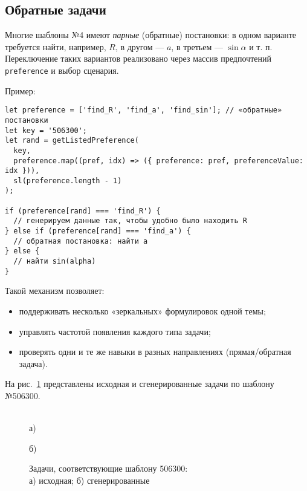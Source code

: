 
\subsection{Обратные задачи}
Многие шаблоны №4 имеют \emph{парные} (обратные) постановки: в одном варианте требуется найти, например, \(R\), в другом — \(a\), в третьем — \(\sin\alpha\) и т. п. 
Переключение таких вариантов реализовано через массив предпочтений \verb|preference| и выбор сценария. 

Пример: 
\begin{lstlisting}
let preference = ['find_R', 'find_a', 'find_sin']; // «обратные» постановки
let key = '506300';
let rand = getListedPreference(
  key,
  preference.map((pref, idx) => ({ preference: pref, preferenceValue: idx })),
  sl(preference.length - 1)
);

if (preference[rand] === 'find_R') {
  // генерируем данные так, чтобы удобно было находить R
} else if (preference[rand] === 'find_a') {
  // обратная постановка: найти a
} else {
  // найти sin(alpha)
}
\end{lstlisting}

\noindent Такой механизм позволяет:
\begin{itemize}
  \item поддерживать несколько «зеркальных» формулировок одной темы;
  \item управлять частотой появления каждого типа задачи;
  \item проверять одни и те же навыки в разных направлениях (прямая/обратная задача).
\end{itemize}

 

На рис.~\ref{ris:506300} представлены исходная и сгенерированные задачи по шаблону №506300.

\begin{figure}[h]
\begin{minipage}[h]{1\linewidth}
 \\а)
\end{minipage}
\vfill
\begin{minipage}[h]{0.95\linewidth}
 б) \\
\end{minipage}
\caption{Задачи, соответствующие шаблону 506300:
\\
а) исходная; б) сгенерированные}
\label{ris:506300}
\end{figure}

